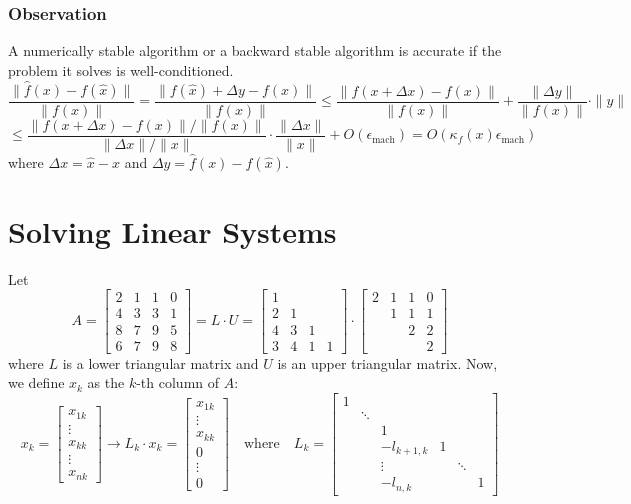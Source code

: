 \documentclass[11pt]{article}
\begin{document}
\subsubsection*{Observation}
A numerically stable algorithm or a backward stable algorithm is accurate if the problem it solves is well-conditioned.
\[\frac{\|\hat{f}(x) - f(\hat{x})\|}{\|f(x)\|} = \frac{\|f(\hat{x}) + \Delta y - f(x)\|}{\|f(x)\|} \leq \frac{\|f(x + \Delta x) - f(x)\|}{\|f(x)\|} + \frac{\|\Delta y\|}{\|f(x)\|} \cdot \|y\|\]
\[\leq \frac{\|f(x + \Delta x) - f(x)\| / \|f(x)\|}{\|\Delta x\| / \|x\|} \cdot \frac{\|\Delta x\|}{\|x\|} + O(\epsilon_{\text{mach}}) = O(\kappa_f(x) \epsilon_{\text{mach}})\]
where \( \Delta x = \hat{x} - x \) and \( \Delta y = \hat{f}(x) - f(\hat{x}) \).

\section{Solving Linear Systems}
Let 
\[A = \begin{bmatrix}
    2 & 1 & 1 & 0 \\
    4 & 3 & 3 & 1 \\
    8 & 7 & 9 & 5 \\
    6 & 7 & 9 & 8
\end{bmatrix}= L \cdot U = \begin{bmatrix}
    1 \\ 
    2 & 1 \\
    4 & 3 & 1 \\
    3 & 4 & 1 & 1
\end{bmatrix} \cdot \begin{bmatrix}
    2 & 1 & 1 & 0 \\
    & 1 & 1 & 1 \\
    & & 2 & 2 \\
    & & & 2
\end{bmatrix}\]
where \( L \) is a lower triangular matrix and \( U \) is an upper triangular matrix. Now, we define \(x_k\) as the \(k\)-th column of \(A\):
\[x_k = \begin{bmatrix}
    x_{1k} \\
    \vdots \\
    x_{kk} \\
    \vdots \\
    x_{nk}
\end{bmatrix} \longrightarrow L_k \cdot x_k = \begin{bmatrix}
    x_{1k} \\
    \vdots \\
    x_{kk} \\
    0 \\
    \vdots \\
    0
\end{bmatrix} \quad \text{where} \quad L_k = \begin{bmatrix}
    1 & & & & & \\
    & \ddots & & & & \\
    & & 1 & & & \\
    & & -l_{k+1,k} & 1 & & \\
    & & \vdots & & \ddots & \\
    & & -l_{n,k} & & & 1
\end{bmatrix}\]
\end{document}
